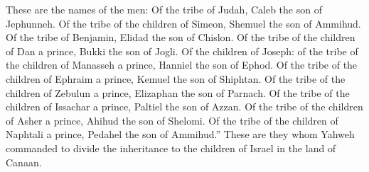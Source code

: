 {These are the names of the men: Of the tribe of Judah, Caleb the son of Jephunneh.
Of the tribe of the children of Simeon, Shemuel the son of Ammihud.
Of the tribe of Benjamin, Elidad the son of Chislon.
Of the tribe of the children of Dan a prince, Bukki the son of Jogli.
Of the children of Joseph: of the tribe of the children of Manasseh a prince, Hanniel the son of Ephod.
Of the tribe of the children of Ephraim a prince, Kemuel the son of Shiphtan.
Of the tribe of the children of Zebulun a prince, Elizaphan the son of Parnach.
Of the tribe of the children of Issachar a prince, Paltiel the son of Azzan.
Of the tribe of the children of Asher a prince, Ahihud the son of Shelomi.
Of the tribe of the children of Naphtali a prince, Pedahel the son of Ammihud.”
These are they whom Yahweh commanded to divide the inheritance to the children of Israel in the land of Canaan.

}
